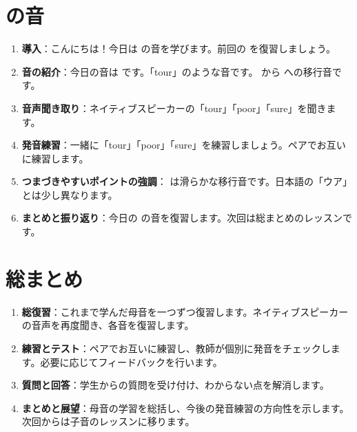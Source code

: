 \documentclass[book,jafontscale=0.9247]{jlreq}
\begin{document}
\section{ の音}
\begin{enumerate}
    \item \textbf{導入}：こんにちは！今日は  の音を学びます。前回の  を復習しましょう。
    \item \textbf{音の紹介}：今日の音は  です。「tour」のような音です。  から  への移行音です。
    \item \textbf{音声聞き取り}：ネイティブスピーカーの「tour」「poor」「sure」を聞きます。
    \item \textbf{発音練習}：一緒に「tour」「poor」「sure」を練習しましょう。ペアでお互いに練習します。
    \item \textbf{つまづきやすいポイントの強調}：  は滑らかな移行音です。日本語の「ウア」とは少し異なります。
    \item \textbf{まとめと振り返り}：今日の  の音を復習します。次回は総まとめのレッスンです。
\end{enumerate}

\section{総まとめ}
\begin{enumerate}
    \item \textbf{総復習}：これまで学んだ母音を一つずつ復習します。ネイティブスピーカーの音声を再度聞き、各音を復習します。
    \item \textbf{練習とテスト}：ペアでお互いに練習し、教師が個別に発音をチェックします。必要に応じてフィードバックを行います。
    \item \textbf{質問と回答}：学生からの質問を受け付け、わからない点を解消します。
    \item \textbf{まとめと展望}：母音の学習を総括し、今後の発音練習の方向性を示します。次回からは子音のレッスンに移ります。
\end{enumerate}
\end{document}
